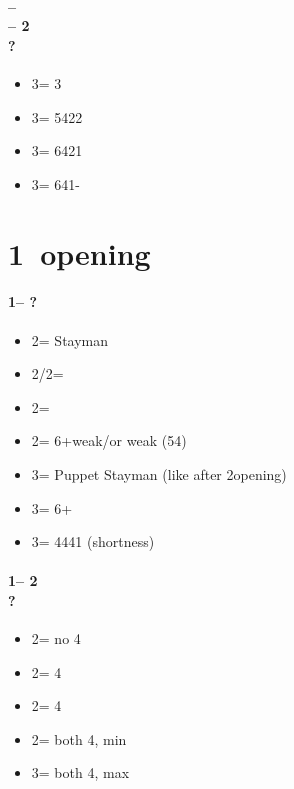 \documentclass[12pt, a4paper]{report}
\begin{document}
{{{            \subsubsection*{ --  \\ 
                             -- 2\nt \\ ?}
            \begin{itemize}
                \item 3\clubs = 3
                \item 3\diams = 5422
                \item 3\hearts = 6421
                \item 3\spades = 641-
            \end{itemize}
        }
    }

    
    \chapter*{\colorbox{Plum!30}{1\ntch\ opening}}
     {
        \subsubsection*{1\nt -- ?}
        \begin{itemize}
            \item 2\clubs = Stayman
            \item 2\diams/2\hearts = \then \major
            \item 2\spades = \then \clubs
            \item 2\nt = 6+\diams weak/\gf or \minor weak (54)
            \item 3\clubs = Puppet Stayman (like after 2\nt opening) \imp
            \item 3\diams = 6+\diams\ \inv
            \item 3\major = 4441 (\major shortness) \gf \qq
        \end{itemize}

        \subsubsection*{1\nt -- 2\clubs\\
                        ?}
        \begin{itemize}
            \item 2\diams = no 4\major
            \item 2\hearts = 4\hearts
            \item 2\spades = 4\spades
            \item 2\nt = both 4\major, min
            \item 3\clubs = both 4\major, max
        \end{itemize}

}}
\end{document}
